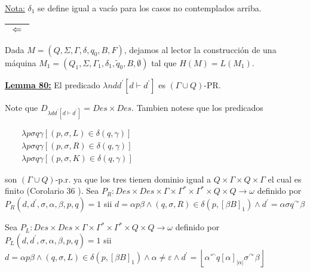     \par \underline{Nota:} $\delta _{1}$ se define igual a vacío para los casos no contemplados arriba.

    \vspace{3mm}
    \begin{tabular}{|c|}\hline $\Leftarrow $\\\hline\end{tabular} Dada $M = (Q, \Sigma, \Gamma, \delta, q_{0}, B, F)$,
    dejamos al lector la construcción de una máquina $M_{1} = (Q_{1}, \Sigma, \Gamma_{1}, \delta_{1}, \tilde{q}_{0}, B,
    \emptyset)$ tal que $H(M) = L(M_{1})$.

  \QED


  \textbf{\underline{Lemma 80:}} El predicado $\lambda ndd^{\prime} \left[d\vdash d^{\prime}\right]$ es $(\Gamma \cup
    Q)$-PR.

  \PROOF Note que $D_{\lambda dd^{\prime}\left[d\vdash d^{\prime }\right] }=Des\times Des$. Tambien notese que los predicados

  $\displaystyle \begin{array}{rcl} & & \lambda p\sigma q\gamma \left[ (p,\sigma ,L)\in \delta (q,\gamma )\right] \\ & & \lambda p\sigma q\gamma \left[ (p,\sigma ,R)\in \delta (q,\gamma )\right] \\ & & \lambda p\sigma q\gamma \left[ (p,\sigma ,K)\in \delta (q,\gamma )\right] \end{array} $

  son $(\Gamma \cup Q)$-p.r. ya que los tres tienen dominio igual a $Q\times \Gamma \times Q\times \Gamma $ el cual es finito (Corolario 36 ). Sea $P_{R}:Des\times Des\times \Gamma \times \Gamma ^{\ast }\times \Gamma ^{\ast }\times Q\times Q\rightarrow \omega $ definido por $P_{R}(d,d^{\prime },\sigma ,\alpha ,\beta ,p,q)=1$ sii
  $\displaystyle d=\alpha p\beta \wedge (q,\sigma ,R)\in \delta \left( p,\left[ \beta B\right] _{1}\right) \wedge d^{\prime }=\alpha \sigma q^{\curvearrowright }\beta $

  Sea $P_{L}:Des\times Des\times \Gamma \times \Gamma ^{\ast }\times \Gamma ^{\ast }\times Q\times Q\rightarrow \omega $ definido por $P_{L}(d,d^{\prime },\sigma ,\alpha ,\beta ,p,q)=1$ sii
  $\displaystyle d=\alpha p\beta \wedge (q,\sigma ,L)\in \delta \left( p,\left[ \beta B\right] _{1}\right) \wedge \alpha \neq \varepsilon \wedge d^{\prime }=\left\lfloor \alpha ^{\curvearrowleft }q\left[ \alpha \right] _{\left\vert \alpha \right\vert }\sigma ^{\curvearrowright }\beta \right\rfloor $

